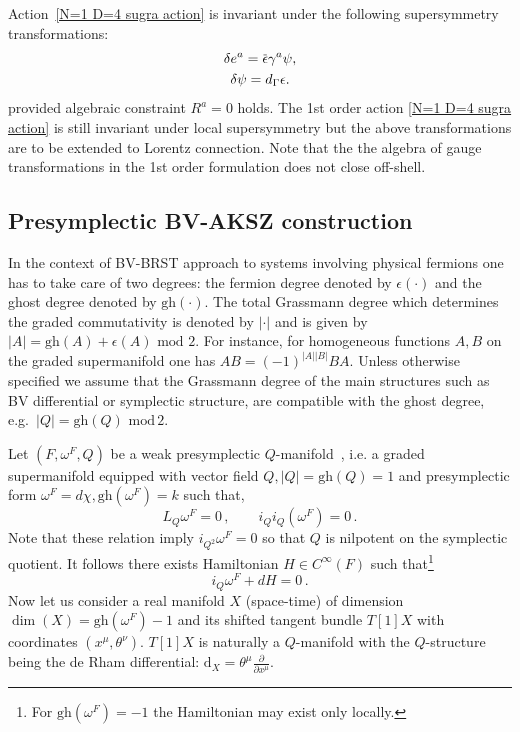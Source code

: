 \documentclass[a4paper,12pt]{article}
\numberwithin{equation}{section} %
\newcommand{\p}[1]{|#1|}
\newcommand{\gh}[1]{\mathrm{gh}(#1)}
\newcommand{\dx}{\mathrm{d}_X}
\numberwithin{equation}{section}
\newcommand{\overbar}[1]{\mkern 1.5mu\overline{\mkern-1.5mu#1\mkern-1.5mu}\mkern 1.5mu}
\newcommand{\atheta}{\theta}
\begin{document}
Action~\eqref{N=1 D=4 sugra action} is invariant under the following supersymmetry transformations:
\begin{equation}
    \begin{gathered}
    \delta e^a = \overbar{\epsilon}\gamma^a \psi,\\    
    \delta \psi = d_\Gamma \epsilon.
\end{gathered}
\end{equation}
provided algebraic constraint $R^a = 0$ holds. The 1st order action \eqref{N=1 D=4 sugra action} is still invariant under local supersymmetry but the above transformations are to be extended to Lorentz connection. Note that the the algebra of gauge transformations in the 1st order formulation  does not close off-shell. 


\subsection{Presymplectic BV-AKSZ construction}

In the context of BV-BRST approach to systems involving physical fermions one has to take care of two degrees: the fermion degree denoted by $\epsilon(\cdot)$ and the ghost degree denoted by $\gh{\cdot}$. The total Grassmann degree which determines the graded commutativity is denoted by $\p{\cdot}$ and is given by $\p{A}=\gh{A}+\epsilon{(A)}\,\, \mathrm{mod}\,\,2$. For instance, for homogeneous functions $A,B$ on the graded supermanifold one has 
$AB=(-1)^{\p{A}\p{B}}BA$. Unless otherwise specified we assume that the Grassmann degree of the main structures such as BV differential or symplectic structure, are compatible with the ghost degree, e.g.~$\p{Q}=\gh{Q} \,\, \mathrm{mod}\,2$.  

Let $(F,\omega^F,Q)$ be a weak presymplectic $Q$-manifold~\cite{Grigoriev:2022zlq}, i.e. a graded supermanifold equipped with vector field $Q,\p{Q}=\gh{Q}=1$ and presymplectic form $\omega^F = d\chi, \gh{\omega^F}=k$ such that,
\begin{equation}
 L_Q \omega^F = 0\,,\qquad  i_Qi_Q( \omega^F)=0\,. 
\end{equation}
Note that these relation imply $i_{Q^2}\omega^F=0$ so that $Q$ is nilpotent on the symplectic quotient. It follows there exists Hamiltonian $H\in C^\infty(F)$ such that\footnote{For $\gh{\omega^F}={-1}$ the Hamiltonian may exist only locally.}
\begin{equation}
    i_Q \omega^F+dH=0\,.
\end{equation}
Now let us consider a real manifold $X$ (space-time) of dimension $\dim(X) = \gh{\omega^F}-1$ and its shifted tangent bundle $T[1]X$ with coordinates $(x^\mu, \atheta^\nu)$. $T[1]X$ is naturally a $Q$-manifold with the $Q$-structure being the de Rham differential: $\dx = \atheta^\mu \frac{\partial}{\partial x^\mu}$. 
\end{document}
